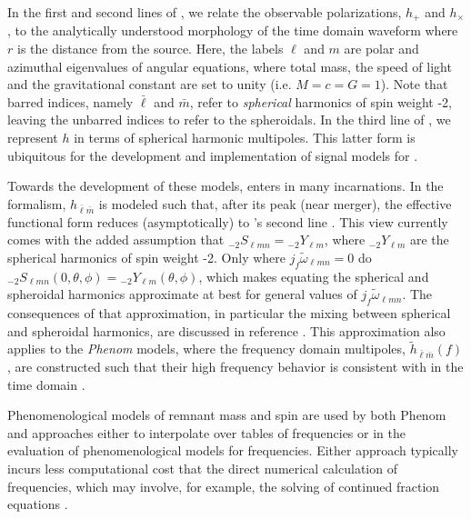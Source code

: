 \documentclass[twocolumn,aps,prd,floatfix,preprintnumbers,a4paper,nofootinbib,
superscriptaddress,10pt]{revtex4-1}
\newcommand{\cw}{\tilde{\omega}}
\def\jf{j_f}
\def\lmn{_{\ell m n}}
\def\LM{_{\bar{\ell} \bar{m}}}
\begin{document}
%
\par In the first and second lines of , we relate the observable \gw{} polarizations, $h_+$ and $h_\times$, to the analytically understood morphology of the time domain \rd{} waveform where $r$ is the distance from the source.
%
Here, the labels $\ell$ and $m$ are polar and azimuthal eigenvalues of  angular equations, where total mass, the speed of light and the gravitational constant are set to unity (i.e. $M=c=G=1$).
%
Note that barred indices, namely $\bar{\ell}$ and $\bar{m}$, refer to \textit{spherical} harmonics of spin weight -2, leaving the unbarred indices to refer to the spheroidals.
%
In the third line of , we represent $h$ in terms of {spherical} harmonic multipoles.
%
This latter form is ubiquitous for the development and implementation of \imr{} signal models for .
%
%
\par Towards the development of these models,  enters in many incarnations.
%
In the \eob{} formalism, $h\LM$ is modeled such that, after its peak (near merger), the effective functional form reduces (asymptotically) to 's second line \cite{Cotesta:2018fcv, Buonanno:2000ef,
Bohe:2016gbl,Pan:2013rra, Bohe:2016gbl, Nagar:2018zoe,Babak:2016tgq}.
%
This view currently comes with the added assumption that ${_{-2}}S_{\ell m n} = {_{-2}}Y_{\ell m}$, where ${_{-2}}Y_{\ell m}$ are the spherical harmonics of spin weight -2.
%
Only where $\jf \cw\lmn=0$ do $_{-2}S\lmn( 0,\theta,\phi) = {_{-2}}Y_{\ell m}(\theta,\phi)$, which makes equating the spherical and spheroidal harmonics approximate at best for general values of $\jf \cw\lmn$.
%
The consequences of that approximation, in particular the mixing between spherical and spheroidal harmonics, are discussed in reference \cite{London:2014cma,Berti:2014fga,London:2018gaq,Kelly:2012nd}.
%
This approximation also applies to the \textit{Phenom} models,
where the frequency domain multipoles, $\tilde{h}\LM(f)$, are constructed such that their high frequency behavior is consistent with  in the time domain
%
\cite{Hannam:2013oca, London:2017bcn, Khan:2015jqa, Schmidt:2014iyl, Mehta:2017jpq,Khan:2018fmp}.
%
\par Phenomenological models of remnant \bh{} mass and spin are used by both Phenom and \eob{} approaches either to interpolate over tables of \qnm{} frequencies or in the evaluation of phenomenological models for \qnm{} frequencies.
%
Either approach typically incurs less computational cost that the direct numerical calculation of \qnm{} frequencies, which may involve, for example, the solving of continued fraction equations \cite{Leaver85}.
\end{document}
